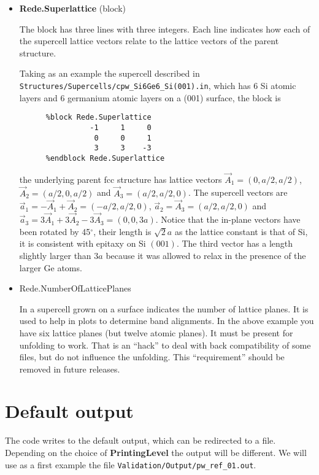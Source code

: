 \documentclass[11pt]{article}
\begin{document}
\begin{itemize}

\item{\bf Rede.Superlattice} (block)

   The block has three lines with three integers.  Each line indicates how each of
   the supercell lattice vectors relate to the lattice vectors of the parent structure.

   Taking as an example the supercell described in
   \texttt{Structures/Supercells/cpw\_Si6Ge6\_Si(001).in}, which has 6 Si atomic layers
   and 6 germanium atomic layers on a (001) surface, the block is
   \begin{verbatim}
      %block Rede.Superlattice
                -1     1     0
                 0     0     1
                 3     3    -3
      %endblock Rede.Superlattice
   \end{verbatim}
   the underlying parent fcc structure has lattice vectors $\vec A_1=(0,a/2,a/2)$,
   $\vec A_2=(a/2,0,a/2)$ and $\vec A_3=(a/2,a/2,0)$.  The supercell vectors
   are $\vec a_1=-\vec A_1+\vec A_2 = (-a/2,a/2,0)$,
   $\vec a_2=\vec A_3=(a/2,a/2,0)$ and
   $\vec a_3=3\vec A_1+3\vec A_2-3\vec A_3 = (0,0,3a)$.
   Notice that the in-plane vectors have been rotated by 45$^\circ$,
   their length is $\sqrt{2} a$ as the lattice constant
   is that of Si, it is consistent with epitaxy on Si $(001)$.
   The third vector has a length slightly larger than $3a$ because
   it was allowed to relax in the presence of the larger Ge atoms.

\item{Rede.NumberOfLatticePlanes}

   In a supercell grown on a surface indicates the number of lattice planes.
   It is used to help in plots to determine band alignments.
   In the above example you have six lattice planes (but twelve atomic planes).
   It must be present for unfolding to work.  That is an ``hack'' to deal
   with back compatibility of some files, but do not influence the
   unfolding.  This ``requirement'' should be removed in future releases.

\end{itemize}

\section{Default output}

The code writes to the default output, which can be redirected to a file.
Depending on the choice of {\bf PrintingLevel} the output will be different.
We will use as a first example  the file {\tt Validation/Output/pw\_ref\_01.out}.
\end{document}
